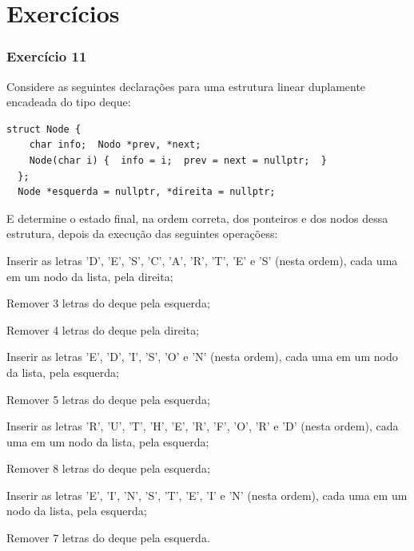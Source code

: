 \documentclass[aspectratio=169]{beamer}
\begin{document}
\section{Exercícios}

\begin{frame}[fragile]\frametitle{Exercício 11}
\begin{enumerate}
        \setcounter{enumi}{10}
{\footnotesize	
	\item Considere as seguintes declarações para uma estrutura linear duplamente encadeada do tipo deque:
\begin{lstlisting}[basicstyle=\ttfamily\tiny]
  struct Node {
    char info;  Nodo *prev, *next;
    Node(char i) {  info = i;  prev = next = nullptr;  }
  };
  Node *esquerda = nullptr, *direita = nullptr;
\end{lstlisting}
E determine o estado final, na ordem correta, dos ponteiros e dos nodos dessa estrutura, depois da execução das seguintes operaçõess:
	\begin{itemize}
{\scriptsize
		\item Inserir as letras 'D', 'E', 'S', 'C', 'A', 'R', 'T', 'E' e 'S' (nesta ordem), cada uma em um nodo da lista, pela direita;
		\item Remover 3 letras do deque pela esquerda;
		\item Remover 4 letras do deque pela direita;
		\item Inserir as letras 'E', 'D', 'I', 'S', 'O' e 'N' (nesta ordem), cada uma em um nodo da lista, pela esquerda;
		\item Remover 5 letras do deque pela esquerda;
		\item Inserir as letras 'R', 'U', 'T', 'H', 'E', 'R', 'F', 'O', 'R' e 'D' (nesta ordem), cada uma em um nodo da lista, pela esquerda;
		\item Remover 8 letras do deque pela esquerda;
		\item Inserir as letras 'E', 'I', 'N', 'S', 'T', 'E', 'I' e 'N' (nesta ordem), cada uma em um nodo da lista, pela esquerda;
		\item Remover 7 letras do deque pela esquerda.
}
	\end{itemize}
}
\end{enumerate}
\end{frame}
\end{document}
